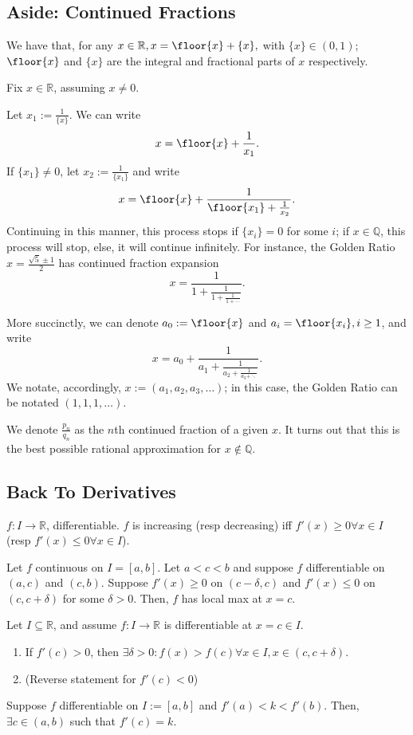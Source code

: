 \subsection{Aside: Continued Fractions}


We have that, for any $x \in \mathbb{R}, x = \floor{x} + \{x\},$ with $\{x\} \in (0, 1)$; $\floor{x}$ and $\{x\}$ are the integral and fractional parts of $x$ respectively.


Fix $x \in \mathbb{R}$, assuming $x \neq 0$.

Let $x_1 := \frac{1}{\{x\}}$. We can write $$x = \floor{x} + \frac{1}{x_1}.$$ If $\{x_1\} \neq 0$, let $x_2 := \frac{1}{\{x_1\}}$ and write \[
    x = \floor{x} + \frac{1}{\floor{x_1} + \frac{1}{x_2}}.
    \]
Continuing in this manner, this process stops if $\{x_i\} = 0$ for some $i$; 
if $x \in \mathbb{Q}$, this process will stop, else, it will continue infinitely. For instance, the Golden Ratio $x = \frac{\sqrt{5} \pm 1}{2}$ has continued fraction expansion \[
x = \frac{1}{1 + \frac{1}{1+\frac{1}{1  + \cdots}}}.    
\]

More succinctly, we can denote $a_0 := \floor{x}$ and $a_i = \floor{x_i}, i \geq 1$, and write \[
x = a_0 + \frac{1}{a_1 + \frac{1}{a_2 + \frac{1}{a_3 + \ddots}}}.
\]
We notate, accordingly, $x := (a_1, a_2, a_3, \dots)$; in this case, the Golden Ratio can be notated $(1, 1,1, \dots)$.

We denote $\frac{p_n}{q_n}$ as the $n$th continued fraction of a given $x$. It turns out that this is the best possible rational approximation for $x \notin \mathbb{Q}$.

\subsection{Back To Derivatives}

\begin{theorem}
    $f: I \to \mathbb{R}$, differentiable. $f$ is increasing (resp decreasing) iff $f'(x) \geq 0 \forall x \in I$ (resp $f'(x) \leq 0 \forall x \in I$).
\end{theorem}
\begin{proposition}
    Let $f$ continuous on $I = [a, b]$. Let $ a< c < b$ and suppose $f$ differentiable on $(a, c)$ and $(c, b)$. Suppose $f'(x) \geq 0$ on $(c - \delta, c)$ and $f'(x) \leq 0$ on $(c, c + \delta)$ for some $\delta > 0$. Then, $f$ has local max at $x = c$.
\end{proposition}
\begin{lemma}
    Let $I\subseteq \mathbb{R}$, and assume $f : I \to \mathbb{R}$ is differentiable at $x = c \in I$. \begin{enumerate}
        \item If $f'(c) > 0$, then $\exists \delta > 0 : f(x) > f(c) \forall x \in I, x \in (c , c + \delta)$.
        \item (Reverse statement for $f'(c) < 0$)
    \end{enumerate}
\end{lemma}

\begin{theorem}[Darboux]
    Suppose $f$ differentiable on $I:=[a, b]$ and $f'(a) < k < f'(b)$. Then, $\exists c \in (a, b)$ such that $f'(c) = k$.
\end{theorem}